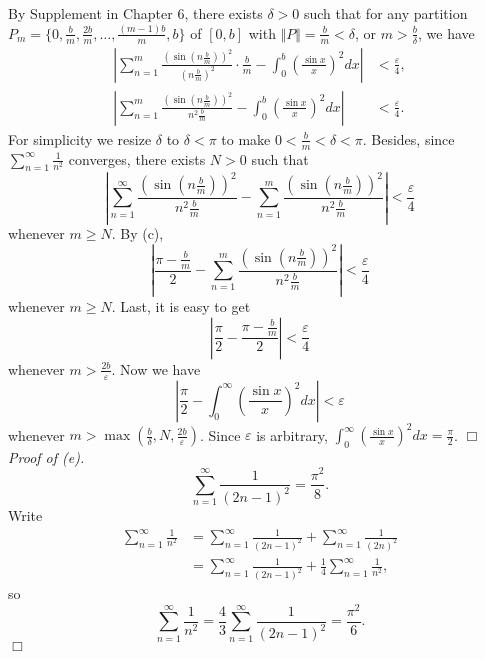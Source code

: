 \documentclass{article}
\begin{document}
By Supplement in Chapter 6, there exists
$\delta > 0$ such that for any partition
$P_m = \{ 0, \frac{b}{m}, \frac{2b}{m}, \ldots, \frac{(m - 1)b}{m}, b\}$ of $[0, b]$
with $\Vert P \Vert = \frac{b}{m} < \delta$, or $m > \frac{b}{\delta}$,
we have
\begin{align*}
\left|
\sum_{n = 1}^{m} \frac{(\sin(n \frac{b}{m}))^2}{(n \frac{b}{m})^2} \cdot \frac{b}{m}
- \int_{0}^{b} \left( \frac{\sin x}{x} \right)^2 dx
\right|
&< \frac{\varepsilon}{4}, \\
\left|
\sum_{n = 1}^{m} \frac{(\sin(n \frac{b}{m}))^2}{n^2 \frac{b}{m}}
- \int_{0}^{b} \left( \frac{\sin x}{x} \right)^2 dx
\right| &< \frac{\varepsilon}{4}.
\end{align*}
For simplicity we resize $\delta$ to $\delta < \pi$ to make $0 < \frac{b}{m} < \delta < \pi$.
Besides, since $\sum_{n = 1}^{\infty} \frac{1}{n^2}$ converges,
there exists $N > 0$ such that
$$\left|
\sum_{n = 1}^{\infty} \frac{(\sin(n \frac{b}{m}))^2}{n^2 \frac{b}{m}}
- \sum_{n = 1}^{m} \frac{(\sin(n \frac{b}{m}))^2}{n^2 \frac{b}{m}}
\right|
< \frac{\varepsilon}{4}$$
whenever $m \geq N$.
By (c),
$$\left|
\frac{\pi - \frac{b}{m}}{2}
- \sum_{n = 1}^{m} \frac{(\sin(n \frac{b}{m}))^2}{n^2 \frac{b}{m}}
\right|
< \frac{\varepsilon}{4}$$
whenever $m \geq N$.
Last, it is easy to get
$$\left|
\frac{\pi}{2}
- \frac{\pi - \frac{b}{m}}{2}
\right|
< \frac{\varepsilon}{4}$$
whenever $m > \frac{2b}{\varepsilon}$.
Now we have
$$\left|
\frac{\pi}{2}
- \int_{0}^{\infty} \left( \frac{\sin x}{x} \right)^2 dx
\right|
< \varepsilon
$$
whenever $m > \max(\frac{b}{\delta}, N, \frac{2b}{\varepsilon})$.
Since $\varepsilon$ is arbitrary,
$\int_{0}^{\infty} \left( \frac{\sin x}{x} \right)^2 dx
= \frac{\pi}{2}$.
$\Box$ \\


\emph{Proof of (e).}
$$\sum_{n = 1}^{\infty} \frac{1}{(2n - 1)^2} = \frac{\pi^2}{8}.$$
Write
\begin{align*}
\sum_{n = 1}^{\infty} \frac{1}{n^2}
&= \sum_{n = 1}^{\infty} \frac{1}{(2n - 1)^2} + \sum_{n = 1}^{\infty} \frac{1}{(2n)^2} \\
&= \sum_{n = 1}^{\infty} \frac{1}{(2n - 1)^2} + \frac{1}{4} \sum_{n = 1}^{\infty} \frac{1}{n^2},
\end{align*}
so
$$\sum_{n = 1}^{\infty} \frac{1}{n^2}
= \frac{4}{3} \sum_{n = 1}^{\infty} \frac{1}{(2n - 1)^2}
= \frac{\pi^2}{6}.$$
$\Box$ \\\\



\end{document}
